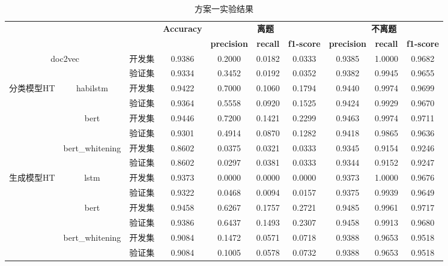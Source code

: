 \documentclass[11pt]{article}
\begin{document}
\begin{CJK}{UTF8}{gkai}
\begin{table}[htbp]\small
  \centering
    \begin{tabular}{c|ccccccccc}
    \hline
    \multicolumn{3}{c}{\multirow{2}[0]{*}{\textcolor[rgb]{ 1,  0,  0}{}}} & \multirow{2}[0]{*}{\textbf{Accuracy}} & \multicolumn{3}{c}{\textbf{离题}} & \multicolumn{3}{c}{\textbf{不离题}} \\
    \multicolumn{3}{c}{} &       & \textbf{precision} & \textbf{recall} & \textbf{f1-score} & \textbf{precision} & \textbf{recall} & \textbf{f1-score} \\
    \hline
    \multicolumn{2}{c}{\multirow{2}[0]{*}{doc2vec}} & 开发集   & 0.9386  & 0.2000  & 0.0182  & 0.0333  & 0.9385  & 1.0000  & 0.9682  \\
    \multicolumn{2}{c}{} & 验证集   & 0.9334  & 0.3452  & 0.0192  & 0.0352  & 0.9382  & 0.9945  & 0.9655  \\
    \hline
    \multirow{6}[0]{*}{分类模型HT} & \multirow{2}[0]{*}{habilstm} & 开发集   & 0.9422  & 0.7000  & 0.1060  & 0.1794  & 0.9440  & 0.9974  & 0.9699  \\
    &       & 验证集   & 0.9364  & 0.5558  & 0.0920  & 0.1525  & 0.9424  & 0.9929  & 0.9670  \\
    \cline{2-10}
    & \multirow{2}[0]{*}{bert} & 开发集   & 0.9446  & 0.7200  & 0.1421  & 0.2299  & 0.9463  & 0.9974  & 0.9711  \\
    &       & 验证集   & 0.9301  & 0.4914  & 0.0870  & 0.1282  & 0.9418  & 0.9865  & 0.9636  \\
    \cline{2-10}
    & \multirow{2}[0]{*}{bert\_whitening} & 开发集   & 0.8602  & 0.0375  & 0.0321  & 0.0333  & 0.9345  & 0.9154  & 0.9246  \\
    &       & 验证集   & 0.8602  & 0.0297  & 0.0381  & 0.0333  & 0.9344  & 0.9152  & 0.9247  \\
    \hline
    \multirow{6}[0]{*}{生成模型HT} & \multirow{2}[0]{*}{lstm} & 开发集   & 0.9373  & 0.0000  & 0.0000  & 0.0000  & 0.9373  & 1.0000  & 0.9676  \\
    &       & 验证集   & 0.9322  & 0.0468  & 0.0094  & 0.0157  & 0.9375  & 0.9939  & 0.9649  \\
    \cline{2-10}
    & \multirow{2}[0]{*}{bert} & 开发集   & 0.9458  & 0.6267  & 0.1757  & 0.2721  & 0.9485  & 0.9961  & 0.9717  \\
    &       & 验证集   & 0.9386  & 0.6437  & 0.1493  & 0.2307  & 0.9458  & 0.9913  & 0.9680  \\
    \cline{2-10}
    & \multirow{2}[0]{*}{bert\_whitening} & 开发集   & 0.9084  & 0.1472  & 0.0571  & 0.0718  & 0.9388  & 0.9653  & 0.9518  \\
    &       & 验证集   & 0.9084  & 0.1005  & 0.0578  & 0.0732  & 0.9388  & 0.9653  & 0.9518  \\
    \hline
    \end{tabular}%
    \caption{方案一实验结果}
  \label{tab:addlabel}%
\end{table}%


\end{CJK}
\end{document}
